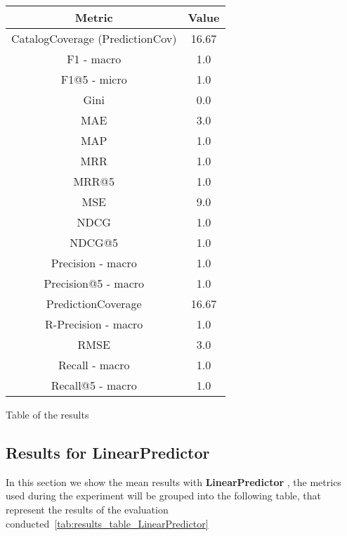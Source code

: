 \documentclass[11pt]{article}
\begin{document}
\begin{center}
    \begin{tabular}{|c|c|}
        \hline
        \textbf{Metric} & \textbf{Value} \\ \hline
                CatalogCoverage (PredictionCov) & 16.67 \\ \hline
                F1 - macro & 1.0 \\ \hline
                F1@5 - micro & 1.0 \\ \hline
                Gini & 0.0 \\ \hline
                MAE & 3.0 \\ \hline
                MAP & 1.0 \\ \hline
                MRR & 1.0 \\ \hline
                MRR@5 & 1.0 \\ \hline
                MSE & 9.0 \\ \hline
                NDCG & 1.0 \\ \hline
                NDCG@5 & 1.0 \\ \hline
                Precision - macro & 1.0 \\ \hline
                Precision@5 - macro & 1.0 \\ \hline
                PredictionCoverage & 16.67 \\ \hline
                R-Precision - macro & 1.0 \\ \hline
                RMSE & 3.0 \\ \hline
                Recall - macro & 1.0 \\ \hline
                Recall@5 - macro & 1.0 \\ \hline
             \end{tabular}
    \captionsetup{type=table}
    \caption{Table of the results}
    \label{tab:results_table_CentroidVector}
\end{center}
\hfill\break
\hfill\break




\subsection{Results for LinearPredictor}\label{subsec:LinearPredictor}
In this section we show the mean results with \textbf{ LinearPredictor }, the metrics used during the experiment will be
grouped into the following table, that represent the results of the evaluation conducted~\ref{tab:results_table_LinearPredictor}
\end{document}
